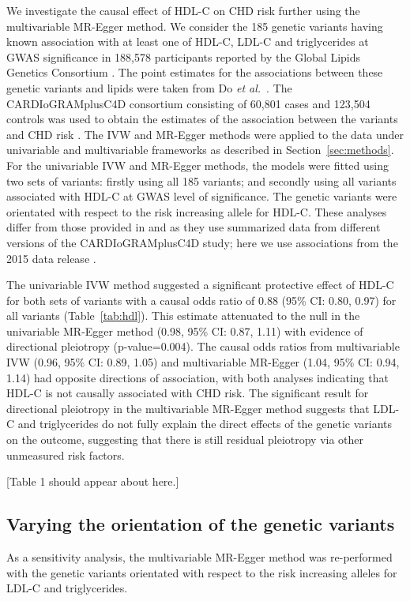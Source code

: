 \documentclass[a4paper,12pt]{article}
\begin{document}
\begin{bibunit}[wileyj]
We investigate the causal effect of HDL-C on CHD risk further using the multivariable MR-Egger method.  We consider the 185 genetic variants having known association with at least one of HDL-C, LDL-C and triglycerides at GWAS significance in 188,578 participants reported by the Global Lipids Genetics Consortium \cite{willer2013}. The point estimates for the associations between these genetic variants and lipids were taken from Do \textit{et al.}\ \cite{do2013}. The CARDIoGRAMplusC4D consortium consisting of 60,801 cases and 123,504 controls was used to obtain the estimates of the association between the variants and CHD risk \cite{nikpay2015}. The IVW and MR-Egger methods were applied to the data under univariable and multivariable frameworks as described in Section~\ref{sec:methods}. For the univariable IVW and MR-Egger methods, the models were fitted using two sets of variants: firstly using all 185 variants; and secondly using all variants associated with HDL-C at GWAS level of significance. The genetic variants were orientated with respect to the risk increasing allele for HDL-C. These analyses differ from those provided in \cite{burgess2014multilipid} and \cite{do2013} as they use summarized data from different versions of the CARDIoGRAMplusC4D study; here we use associations from the 2015 data release \cite{nikpay2015}.

The univariable IVW method suggested a significant protective effect of HDL-C for both sets of variants with a causal odds ratio of 0.88 (95\% CI: 0.80, 0.97) for all variants (Table~\ref{tab:hdl}). This estimate attenuated to the null in the univariable MR-Egger method (0.98, 95\% CI: 0.87, 1.11) with evidence of directional pleiotropy (p-value=0.004). The causal odds ratios from multivariable IVW (0.96, 95\% CI: 0.89, 1.05) and multivariable MR-Egger (1.04, 95\% CI: 0.94, 1.14) had opposite directions of association, with both analyses indicating that HDL-C is not causally associated with CHD risk. The significant result for directional pleiotropy in the multivariable MR-Egger method suggests that LDL-C and triglycerides do not fully explain the direct effects of the genetic variants on the outcome, suggesting that there is still residual pleiotropy via other unmeasured risk factors.  

\begin{center}
[Table 1 should appear about here.]
\end{center}

\subsection{Varying the orientation of the genetic variants}
As a sensitivity analysis, the multivariable MR-Egger method was re-performed with the genetic variants orientated with respect to the risk increasing alleles for LDL-C and triglycerides.  


\end{bibunit}
\end{document}
